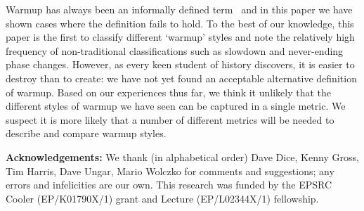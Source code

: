 \documentclass[a4paper,UKenglish]{lipics}
\begin{document}
Warmup has always been an informally defined term~\cite{seaton15phd} and in this
paper we have shown cases where the definition fails to hold.
To the best of our knowledge, this paper is the first to classify different
`warmup' styles and note the relatively high frequency of non-traditional
classifications such as slowdown and never-ending phase changes.
However, as every keen student of history discovers, it is easier to destroy than to
create: we have not yet found an acceptable alternative definition of warmup.
Based on our experiences thus far, we think it unlikely that the different
styles of warmup we have seen can be captured in a single metric. We suspect it
is more likely that a number of different metrics will be needed to describe and
compare warmup styles.

\textbf{Acknowledgements:} We thank (in alphabetical order) Dave Dice, Kenny
Gross, Tim Harris, Dave Ungar, Mario Wolczko for comments and suggestions; any
errors and infelicities are our own. This research was funded by the EPSRC
Cooler (EP/K01790X/1) grant and Lecture (EP/L02344X/1) fellowship.




%


% 
% 
% 
% 
\end{document}
